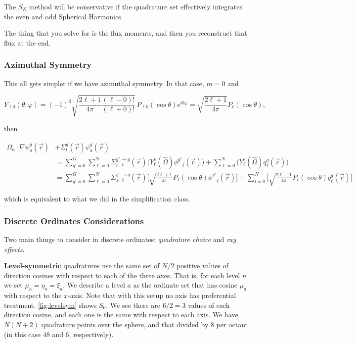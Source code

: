 \documentclass[12pt]{article}
\newcommand{\Macro}{\ensuremath{\Sigma}}
\newcommand{\vecr}{\ensuremath{\vec{r}}}
\newcommand{\vOmega}{\ensuremath{\hat{\Omega}}}
\newcommand{\evenp}{\ensuremath{\phi^{g'}}}
\newcommand{\sigg}[1]{\ensuremath{\Macro^{g'\rightarrow g}_{s,#1}}}
\begin{document}
The $S_N$ method will be conservative if the quadrature set effectively
integrates the even and odd Spherical Harmonics.

The thing that you solve for is the flux moments, and then you reconstruct 
that flux at the end.

\subsubsection*{Azimuthal Symmetry}

This all gets simpler if we have azimuthal symmetry. In that case, $m=0$ and 

\[
  Y_{\ell0}(\theta,\varphi) = (-1)^0\sqrt
  {
    \frac{2\ell+1}{4\pi}\frac{(\ell-0)!}{(\ell+0)!}
  }\,
  P_{\ell0}(\cos\theta)\mathrm{e}^{i0\varphi} =
  \sqrt{\frac{2\ell+1}{4\pi}}P_{\ell}(\cos\theta),
\]

then

\begin{align*}
\vOmega_a \cdot \nabla \psi^g_a(\vecr) &+ \Sigma^g_t(\vecr)\psi^g_a(\vecr)  \\
&=\sum_{g'=0}^G
  \sum_{\ell=0}^N
  \sigg{\ell}(\vec{r})
  \bigl(
  Y^e_{\ell}(\vOmega) \evenp_{\ell}(\vec{r}) \bigr)
+\sum_{\ell=0}^{N}\bigl(
  Y^e_{\ell}(\vOmega)q^g_{\ell}(\vecr)\bigr)\\
 &=\sum_{g'=0}^G
  \sum_{\ell=0}^N \sigg{\ell}(\vec{r})
  \bigg[\sqrt{\frac{2\ell+1}{4\pi}}P_{\ell}(\cos\theta)\evenp_{\ell}(\vec{r}) \bigg]
  + \sum_{l=0}^{N}
  \bigg[\sqrt{\frac{2\ell+1}{4\pi}}P_{\ell}(\cos\theta)q^g_{\ell}(\vecr)\bigg]
\end{align*}

which is equivalent to what we did in the simplification class.

\subsubsection*{Discrete Ordinates Considerations}

Two main things to consider in discrete ordinates: \textit{quadrature choice} 
and \textit{ray effects}. 

\textbf{Level-symmetric} quadratures use the same set of $N/2$ positive values 
of direction cosines with respect to each of the three axes. That is, for each 
level $n$ we set $\mu_a = \eta_a = \xi_a$. We describe a level $a$ as the 
ordinate set that has cosine $\mu_a$ with respect to the $x$-axis. Note that 
with this setup no axis has preferential treatment. \autoref{fig:levelsym} 
shows $S_6$. We see there are $6/2 = 3$ values of each direction cosine, and 
each one is the same with respect to each axis. We have $N(N+2)$ quadrature
points over the sphere, and that divided by 8 per octant (in this case 48 and
6, respectively). 
\end{document}
